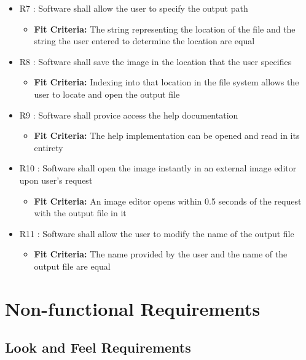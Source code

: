 \documentclass[12pt, titlepage]{article}
\begin{document}
\begin{itemize}
\begin{itemize}
\end{itemize}
\item{R7 : Software shall allow the user to specify the output path}
\begin{itemize}
\item{\textbf{Fit Criteria:} The string representing the location of the file and the string the user entered to determine the location are equal}
\end{itemize}
\item{R8 : Software shall save the image in the location that the user specifies}
\begin{itemize}
\item{\textbf{Fit Criteria:} Indexing into that location in the file system allows the user to locate and open the output file}
\end{itemize}
\item{R9 : Software shall provice access the help documentation}
\begin{itemize}
\item{\textbf{Fit Criteria:} The help implementation can be opened and read in its entirety}
\end{itemize}
\item{R10 : Software shall open the image instantly in an external image editor upon user's request}
\begin{itemize}
\item{\textbf{Fit Criteria:} An image editor opens within 0.5 seconds of the request with the output file in it}
\end{itemize}
\item{R11 : Software shall allow the user to modify the name of the output file}
\begin{itemize}
\item{\textbf{Fit Criteria:} The name provided by the user and the name of the output file are equal}
\end{itemize}
\end{itemize}

\section{Non-functional Requirements}

\subsection{Look and Feel Requirements}
\end{document}
